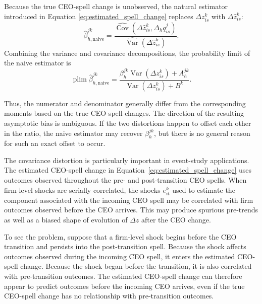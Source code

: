 \documentclass[11pt,a4paper]{article}
\begin{document}
Because the true CEO-spell change is unobserved, the natural estimator introduced in Equation \ref{eq:estimated_spell_change}
replaces $\Delta z_{is}^{k}$ with $\Delta\widehat z_{is}^{k}$:
\begin{equation}
\widehat\beta_{h,\mathrm{naive}}^{jk}
=
\frac{
\widehat{\operatorname{Cov}}\!\left(
\Delta\widehat z_{is}^{k},
\Delta_h q_{is}^{j}
\right)
}{
\widehat{\operatorname{Var}}\!\left(
\Delta\widehat z_{is}^{k}
\right)
}.
\label{eq:naive_beta}
\end{equation}
Combining the variance and covariance decompositions, the probability
limit of the naive estimator is
\begin{equation}
\operatorname{plim}
\widehat\beta_{h,\mathrm{naive}}^{jk}
=
\frac{
\beta_h^{jk}
\operatorname{Var}\!\left(
\Delta z_{is}^{k}
\right)
+
A_h^{jk}
}{
\operatorname{Var}\!\left(
\Delta z_{is}^{k}
\right)
+
B^{k}
}.
\label{eq:naive_beta_plim}
\end{equation}

Thus, the numerator and denominator generally differ from the
corresponding moments based on the true CEO-spell changes. The
direction of the resulting asymptotic bias is ambiguous. If the two
distortions happen to offset each other in the ratio, the naive
estimator may recover $\beta_h^{jk}$, but there is no general reason
for such an exact offset to occur.

The covariance distortion is particularly important in event-study
applications. The estimated CEO-spell change in
Equation~\eqref{eq:estimated_spell_change} uses outcomes observed
throughout the pre- and post-transition CEO spells. When firm-level
shocks are serially correlated, the shocks $e_{it}^{k}$ used to estimate the component
associated with the incoming CEO spell may be correlated with firm
outcomes observed before the CEO arrives. This may produce spurious pre-trends as well as a biased shape of evolution of $\Delta z$ after the CEO change.

To see the problem, suppose that a firm-level shock begins before the
CEO transition and persists into the post-transition spell. Because the
shock affects outcomes observed during the incoming CEO spell, it
enters the estimated CEO-spell change. Because the shock began before
the transition, it is also correlated with pre-transition outcomes.
The estimated CEO-spell change can therefore appear to predict outcomes
before the incoming CEO arrives, even if the true CEO-spell change has
no relationship with pre-transition outcomes.
\end{document}
